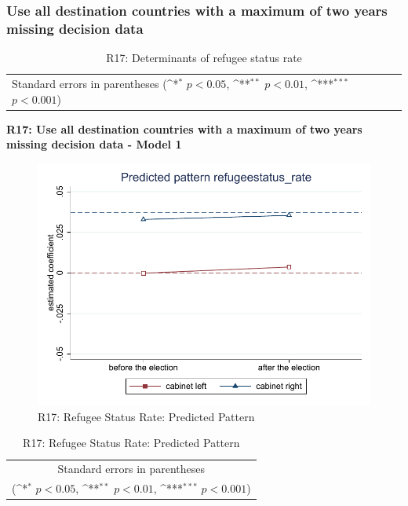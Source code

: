 \documentclass[10pt,a4paper]{scrartcl}
\begin{document}


\clearpage
\FloatBarrier
\subsubsection{Use all destination countries with a maximum of two years missing decision data}
\begin{table}[!ht]\centering
	\renewcommand{\arraystretch}{1.25}
	\small
	\def\sym#1{\ifmmode^{#1}\else\(^{#1}\)\fi}
	\caption{R17: Determinants of refugee status rate}
	\begin{tabular}{l*{3}{c}}
		\hline\hline
		
		\hline\hline
		\multicolumn{4}{l}{\footnotesize Standard errors in parentheses (\sym{*} \(p<0.05\), \sym{**} \(p<0.01\), \sym{***} \(p<0.001\))}\\
	\end{tabular}
\end{table}

\clearpage
\textbf{R17: Use all destination countries with a maximum of two years missing decision data - Model 1}
\begin{figure}[!ht]
	\centering
	\includegraphics[width=1\textwidth]{figures_edited/refugeestatus_rate_graph1_R17.pdf}
	\caption{R17: Refugee Status Rate: Predicted Pattern}
\end{figure}

\begin{table}[!ht]\centering
	\renewcommand{\arraystretch}{1.25}
	\def\sym#1{\ifmmode^{#1}\else\(^{#1}\)\fi}
	\caption{R17: Refugee Status Rate: Predicted Pattern}
	\begin{tabular}{l*{2}{c}}
		\hline\hline
		
		\hline\hline
		\multicolumn{3}{c}{\footnotesize Standard errors in parentheses} \\
		\multicolumn{3}{c}{\footnotesize (\sym{*} \(p<0.05\), \sym{**} \(p<0.01\), \sym{***} \(p<0.001\))}\\
	\end{tabular}
\end{table}
\end{document}
